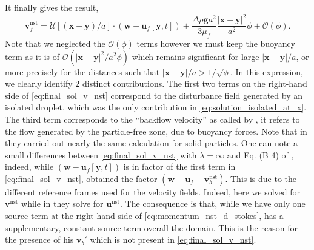 It finally gives the result, 
\begin{equation}
    \textbf{v}^\text{nst}_f
    =
    \mathcal{U}[(\textbf{x} - \textbf{y})/a]\cdot 
    (\textbf{w}- \textbf{u}_f[\textbf{y},t])
    + 
    \frac{\Delta \rho \textbf{g}a^2}{3\mu_f} \frac{ |\textbf{x}-\textbf{y}|^2}{a^2}\phi
    +
    \mathcal{O}(\phi).
    \label{eq:final_sol_v_nst}
\end{equation}
Note that we neglected the $\mathcal{O}(\phi)$ terms however we must keep the buoyancy term as it is of $\mathcal{O}(|\textbf{x}-\textbf{y}|^2/a^2\phi)$ which remains significant  for large $|\textbf{x}-\textbf{y}|/a$, or more precisely for the distances such that $|\textbf{x}-\textbf{y}|/a  > 1/\sqrt{\phi}$. 
In this expression, we clearly identify $2$ distinct contributions. 
The first two terms on the right-hand side of \ref{eq:final_sol_v_nst} correspond to the disturbance field generated by an isolated droplet, which was the only contribution in \ref{eq:solution_isolated_at_x}. 
The third term corresponds to the ``backflow velocity'' as called by \citet{zhang2021ensemble}, it refers to the flow generated by the particle-free zone, due to buoyancy forces. 
Note that in \citet[Appendix A]{zhang2021ensemble} they carried out nearly the same calculation for solid particles.
One can note a small differences between \ref{eq:final_sol_v_nst} with $\lambda = \infty$ and Eq. (B 4) of  \citet[Appendix A]{zhang2021ensemble} , indeed, while $(\textbf{w}- \textbf{u}_f[\textbf{y},t])$ is in factor of the first term in \ref{eq:final_sol_v_nst}, \citet[Appendix A]{zhang2021ensemble} obtained the factor $(\textbf{w}- \textbf{u}_f - \textbf{v}_b^\text{nst})$. 
This is due to the different reference frames used for the velocity fields.
Indeed, here we solved for $\textbf{v}^\text{nst}$ while in \citet{zhang2021ensemble} they solve for $\textbf{u}^\text{nst}$. 
The consequence is that, while we have only one source term at the right-hand side of \ref{eq:momentum_nst_d_stokes}, \citet{zhang2021ensemble} has a supplementary, constant source term overall the domain. 
This is the reason for the presence of his $\textbf{v}_b'$ which is not present in \ref{eq:final_sol_v_nst}. 


